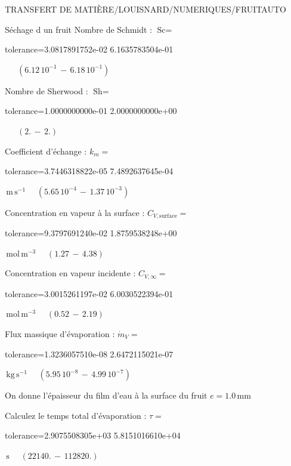 \documentclass[12pt]{article}
\begin{document}
\begin{quiz}{TRANSFERT DE MATIÈRE/LOUISNARD/NUMERIQUES/FRUITAUTO}
\begin{cloze}{Séchage d un fruit}
Nombre de Schmidt : $\text{Sc} =  $
\begin{numerical}[points=1] 
\item[tolerance={3.0817891752e-02}] 6.1635783504e-01 
\end{numerical} 
 $\,$ 
 $ \quad ( 6.12 \, 10^{-1}  \, - \,  6.18 \, 10^{-1} ) $ 

Nombre de Sherwood : $\text{Sh} =  $
\begin{numerical}[points=2] 
\item[tolerance={1.0000000000e-01}] 2.0000000000e+00 
\end{numerical} 
 $\,$ 
 $ \quad (2. \, - \, 2.) $ 

Coefficient d'échange : $k_m =  $
\begin{numerical}[points=1] 
\item[tolerance={3.7446318822e-05}] 7.4892637645e-04 
\end{numerical} 
 $\,  \mathrm{m}\,  \mathrm{s}^{-1}$ 
 $ \quad ( 5.65 \, 10^{-4}  \, - \,  1.37 \, 10^{-3} ) $ 

Concentration en vapeur à la surface : $C_{V, \text{surface}} =  $
\begin{numerical}[points=2] 
\item[tolerance={9.3797691240e-02}] 1.8759538248e+00 
\end{numerical} 
 $\,  \mathrm{mol}\,  \mathrm{m}^{-3}$ 
 $ \quad (1.27 \, - \, 4.38) $ 

Concentration en vapeur incidente : $C_{V, \infty} =  $
\begin{numerical}[points=2] 
\item[tolerance={3.0015261197e-02}] 6.0030522394e-01 
\end{numerical} 
 $\,  \mathrm{mol}\,  \mathrm{m}^{-3}$ 
 $ \quad (0.52 \, - \, 2.19) $ 

Flux massique d'évaporation : $\dot{m}_V =  $
\begin{numerical}[points=1] 
\item[tolerance={1.3236057510e-08}] 2.6472115021e-07 
\end{numerical} 
 $\,  \mathrm{kg}\,  \mathrm{s}^{-1}$ 
 $ \quad ( 5.95 \, 10^{-8}  \, - \,  4.99 \, 10^{-7} ) $ 

 

On donne l'épaisseur du film d'eau à la surface du fruit $e = 1.0\,  \mathrm{mm} $

Calculez le temps total d'évaporation : $\tau =  $
\begin{numerical}[points=2] 
\item[tolerance={2.9075508305e+03}] 5.8151016610e+04 
\end{numerical} 
 $\,  \mathrm{s}$ 
 $ \quad (22140. \, - \, 112820.) $ 


\end{cloze}
\end{quiz}
\end{document}
